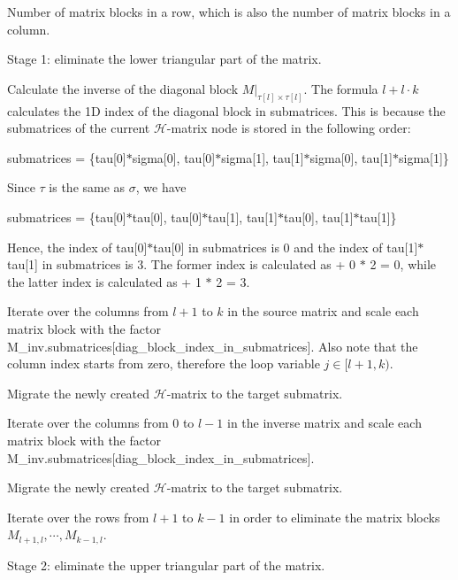 Number of matrix blocks in a row, which is also the number of matrix blocks in a column.

Stage 1\+: eliminate the lower triangular part of the matrix.

Calculate the inverse of the diagonal block $M \vert_{\tau[l]\times\tau[l]}$. The formula $l + l \cdot k$ calculates the 1D index of the diagonal block in {\ttfamily submatrices}. This is because the submatrices of the current $\mathcal{H}$-\/matrix node is stored in the following order\+:

{\ttfamily  submatrices = \{tau\mbox{[}0\mbox{]}$\ast$sigma\mbox{[}0\mbox{]}, tau\mbox{[}0\mbox{]}$\ast$sigma\mbox{[}1\mbox{]}, tau\mbox{[}1\mbox{]}$\ast$sigma\mbox{[}0\mbox{]}, tau\mbox{[}1\mbox{]}$\ast$sigma\mbox{[}1\mbox{]}\} }

Since $\tau$ is the same as $\sigma$, we have

{\ttfamily  submatrices = \{tau\mbox{[}0\mbox{]}$\ast$tau\mbox{[}0\mbox{]}, tau\mbox{[}0\mbox{]}$\ast$tau\mbox{[}1\mbox{]}, tau\mbox{[}1\mbox{]}$\ast$tau\mbox{[}0\mbox{]}, tau\mbox{[}1\mbox{]}$\ast$tau\mbox{[}1\mbox{]}\} }

Hence, the index of {\ttfamily tau}\mbox{[}0\mbox{]}$\ast$tau\mbox{[}0\mbox{]} in {\ttfamily submatrices} is 0 and the index of {\ttfamily tau}\mbox{[}1\mbox{]}$\ast$tau\mbox{[}1\mbox{]} in {\ttfamily submatrices} is 3. The former index is calculated as { + 0 $\ast$ 2 = 0}, while the latter index is calculated as { + 1 $\ast$ 2 = 3}.

Iterate over the columns from $l + 1$ to $k$ in the source matrix and scale each matrix block with the factor {\ttfamily M\+\_\+inv.\+submatrices}\mbox{[}diag\+\_\+block\+\_\+index\+\_\+in\+\_\+submatrices\mbox{]}. Also note that the column index starts from zero, therefore the loop variable $j \in [l+1, k)$.

Migrate the newly created $\mathcal{H}$-\/matrix to the target submatrix.

Iterate over the columns from $0$ to $l - 1$ in the inverse matrix and scale each matrix block with the factor {\ttfamily M\+\_\+inv.\+submatrices}\mbox{[}diag\+\_\+block\+\_\+index\+\_\+in\+\_\+submatrices\mbox{]}.

Migrate the newly created $\mathcal{H}$-\/matrix to the target submatrix.

Iterate over the rows from $l + 1$ to $k - 1$ in order to eliminate the matrix blocks $M_{l+1,l}, \cdots, M_{k - 1,l}$.

Stage 2\+: eliminate the upper triangular part of the matrix.

